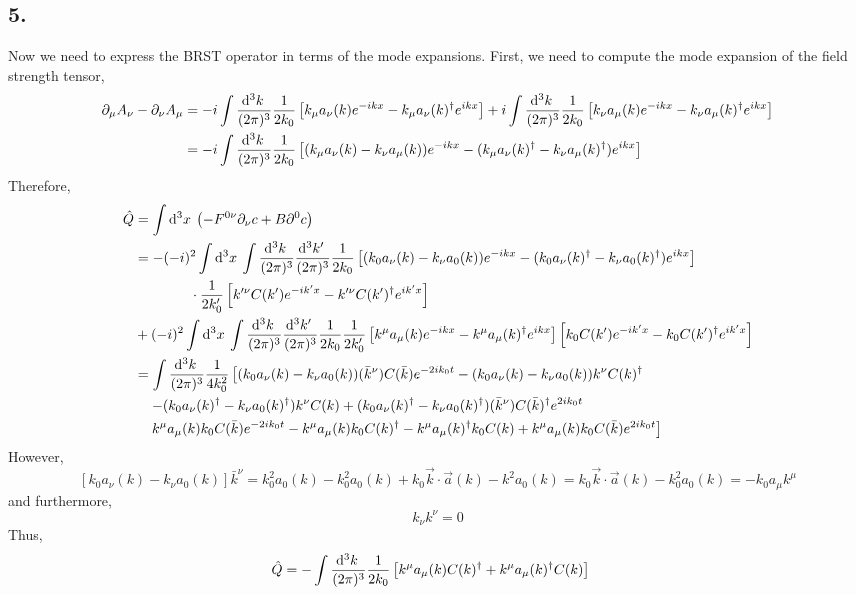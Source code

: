 \documentclass[12pt]{article}
\begin{document}
\subsection*{5.}

Now we need to express the BRST operator in terms of the mode expansions. First, we need to compute the mode expansion of the field strength tensor,
\begin{align*}
\partial_\mu A_\nu - \partial_\nu A_\mu & = -i \int \frac{\mathrm{d}^{3} k \:}{(2\pi)^3} \frac{1}{2 k_0} \left[  k_\mu a_\nu(k) e^{-ikx} - k_\mu a_\nu(k)^\dagger e^{ikx} \right] + i \int \frac{\mathrm{d}^{3} k \:}{(2\pi)^3} \frac{1}{2 k_0} \left[ k_\nu a_\mu(k) e^{-ikx}  - k_\nu a_\mu(k)^\dagger e^{ikx} \right] 
\\
& = -i \int \frac{\mathrm{d}^{3} k \:}{(2 \pi)^3} \frac{1}{2 k_0} \left[ (k_\mu a_\nu(k) - k_\nu a_\mu(k) ) e^{-ikx} - (k_\mu a_\nu(k)^\dagger - k_\nu a_\mu(k)^\dagger) e^{ikx} \right]
\end{align*}
Therefore,
\begin{align*}
\hat{Q} & = \int \mathrm{d}^{3} x \: \left( - F^{0 \nu} \partial_\nu c + B \partial^0 c \right)
\\
& = -(-i)^2 \int \mathrm{d}^{3} x \: \int \frac{\mathrm{d}^{3} k \:}{(2 \pi)^3} \frac{\mathrm{d}^{3} k' \:}{(2 \pi)^3}
\frac{1}{2 k_0} \left[ (k_0 a_\nu(k) - k_\nu a_0(k) ) e^{-ikx} - (k_0 a_\nu(k)^\dagger - k_\nu a_0(k)^\dagger) e^{ikx} \right]
\\
& \quad \quad \quad \quad \cdot
\frac{1}{2 k_0'} \left[ k'^\nu C(k') e^{-ik'x} - k'^\nu C(k')^\dagger e^{ik'x}  \right] 
\\
&  + (-i)^2  \int \mathrm{d}^{3} x \: \int \frac{\mathrm{d}^{3} k \:}{(2 \pi)^3}  \frac{\mathrm{d}^{3} k' \:}{(2 \pi)^3} \frac{1}{2 k_0} \frac{1}{2 k_0'} \left[ k^\mu a_\mu(k) e^{-ikx} - k^\mu a_\mu(k)^\dagger e^{ikx} \right] \left[ k_0 C(k') e^{-ik'x} - k_0 C(k')^\dagger e^{ik'x} \right]
\\
& = \int \frac{\mathrm{d}^{3} k \:}{(2 \pi)^3} \frac{1}{4 k_0^2}\left[ (k_0 a_\nu(k) - k_\nu a_0(k)) (\bar{k}^\nu) C(\bar{k}) e^{-2i k_0 t} - (k_0 a_\nu(k) - k_\nu a_0(k)) k^\nu C(k)^\dagger 
\right. 
\\
& \quad \left. - (k_0 a_\nu(k)^\dagger - k_\nu a_0(k)^\dagger) k^\nu C(k) + (k_0 a_\nu(k)^\dagger - k_\nu a_0(k)^\dagger) (\bar{k}^\nu) C(\bar{k})^\dagger e^{2i k_0 t} \right.
\\
& \quad \left.  k^\mu a_\mu(k) k_0 C(\bar{k}) e^{-2 i k_0 t} - k^\mu a_\mu(k) k_0 C(k)^\dagger - k^\mu a_\mu(k)^\dagger k_0 C(k) + k^\mu a_\mu(k) k_0 C(\bar{k}) e^{2 i k_0 t} \right]
\end{align*}
However,
\[ \left[ k_0 a_\nu(k) - k_\nu a_0(k) \right] \bar{k}^\nu = k_0^2 a_0(k) - k_0^2 a_0(k) + k_0 \vec{k} \cdot \vec{a}(k) - k^2 a_0(k) = k_0 \vec{k} \cdot \vec{a}(k) - k_0^2 a_0(k) = - k_0 a_\mu k^\mu \]
and furthermore,
\[ k_\nu k^\nu = 0 \]
Thus,
\begin{align*}
\hat{Q} & = - \int \frac{\mathrm{d}^{3} k \:}{(2 \pi)^3} \frac{1}{2 k_0} \left[ k^\mu a_\mu(k) C(k)^\dagger + k^\mu a_\mu(k)^\dagger C(k) \right]
\end{align*}
\end{document}
